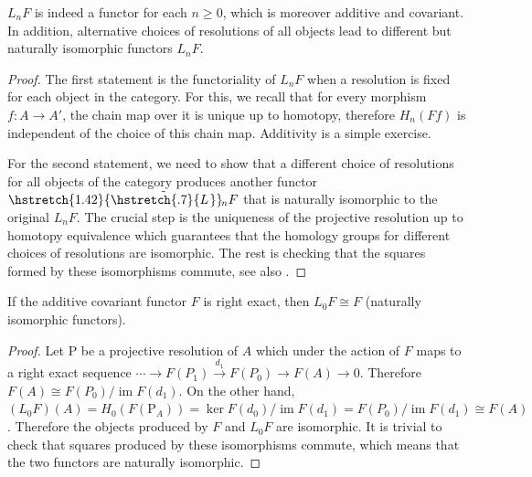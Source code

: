 \documentclass[english,letterpaper]{article}%
\numberwithin{equation}{section}
\numberwithin{figure}{section}
\numberwithin{table}{section}
\theoremstyle{definition}
\theoremstyle{definition}
\theoremstyle{definition}
\theoremstyle{plain}
\theoremstyle{plain}
\theoremstyle{plain}
\theoremstyle{plain}
\theoremstyle{remark}
\theoremstyle{remark}
\newcommand{\bm}[1]{\boldsymbol{\mathrm{#1}}}
\renewcommand{\geq}{\geqslant}
\DeclareMathOperator{\im}{im}
\newcommand\wt[1]{\hstretch{1.42}{\tilde{\hstretch{.7}{#1\mkern2mu}}}\mkern-2mu}
\begin{document}
\begin{prop}
    $L_n F$ is indeed a functor for each $n\geq 0$, which is moreover additive and covariant. In addition, alternative choices of resolutions of all objects lead to different but naturally isomorphic functors $L_n F$.
\end{prop}
\begin{proof}
     The first statement is the functoriality of $L_n F$ when a resolution is fixed for each object in the category. For this, we recall that for every morphism $f:A\to A'$, the chain map over it is unique up to homotopy, therefore $H_n(F f)$ is independent of the choice of this chain map. Additivity is a simple exercise.
     
     For the second statement, we need to show that a different choice of resolutions for all objects of the category produces another functor $\wt{L}_n F$ that is naturally isomorphic to the original $L_n F$. The crucial step is the uniqueness of the projective resolution up to homotopy equivalence which guarantees that the homology groups for different choices of resolutions are isomorphic. The rest is checking that the squares formed by these isomorphisms commute, see also \cite[Prop. 6.20]{Rotman}.
\end{proof}


\begin{lem}
    If the additive covariant functor $F$ is right exact, then $L_0 F\cong F$ (naturally isomorphic functors).
\end{lem}
\begin{proof}
     Let $\bm{P}$ be a projective resolution of $A$ which under the action of $F$ maps to a right exact sequence $\cdots\to F(P_1)\overset{d_1}\to F(P_0)\to F(A)\to 0$. Therefore $F(A)\cong F(P_0)/\im F(d_1)$. On the other hand, $(L_0 F)(A)=H_0(F(\bm{P}_A))=\ker F(d_0)/\im F(d_1)=F(P_0)/\im F(d_1)\cong F(A)$. Therefore the objects produced by $F$ and $L_0F$ are isomorphic. It is trivial to check that squares produced by these isomorphisms commute, which means that the two functors are naturally isomorphic.
\end{proof}
\end{document}
